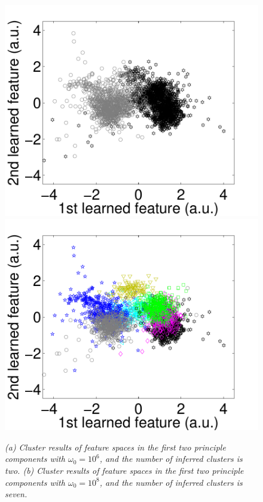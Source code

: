 \documentclass[journal]{IEEEtran}
\begin{document}
\begin{figure}[!htbp]
\centering

   \includegraphics[scale=0.24,angle=0] {figs_new/Tuning_Parameter1.pdf}
   \includegraphics[scale=0.24,angle=0] {figs_new/Tuning_Parameter2.pdf}
   \label{fig:Tuning_Parameter2}
  \caption{\label{fig:Tuning_Parameter}\small \emph{(a) Cluster results of feature spaces in the first two principle components with $\omega_0=10^{6}$, and the number of inferred clusters is two. (b) Cluster results of feature spaces in the first two principle components with $\omega_0=10^{8}$, and the number of inferred clusters is seven.
   }}
\end{figure}
\end{document}
